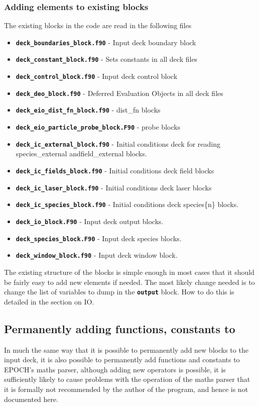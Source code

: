 \documentclass[12pt,a4paper]{article}
\newcommand{\inlinecode}[1]{{\color{warwickred} \bf\texttt{#1}}}
\newcommand{\EPOCH}{{\color{warwickdark}\fontfamily{phv}\selectfont{EPOCH}}}
\begin{document}
\subsubsection{Adding elements to existing blocks}
The existing blocks in the code are read in the following files
\begin{itemize}
\item \inlinecode{deck\_boundaries\_block.f90} - Input deck boundary block
\item \inlinecode{deck\_constant\_block.f90} - Sets constants in all deck files
\item \inlinecode{deck\_control\_block.f90} - Input deck control block
\item \inlinecode{deck\_deo\_block.f90} - Deferred Evaluation Objects in all
  deck files
\item \inlinecode{deck\_eio\_dist\_fn\_block.f90} - dist\_fn blocks
\item \inlinecode{deck\_eio\_particle\_probe\_block.F90} - probe blocks
\item \inlinecode{deck\_ic\_external\_block.f90} - Initial conditions deck for
  reading species\_external and\linebreak field\_external blocks.
\item \inlinecode{deck\_ic\_fields\_block.f90} - Initial conditions deck field
  blocks
\item \inlinecode{deck\_ic\_laser\_block.f90} - Initial conditions deck laser
  blocks
\item \inlinecode{deck\_ic\_species\_block.f90} - Initial conditions deck
  species\{n\} blocks.
\item \inlinecode{deck\_io\_block.F90} - Input deck output blocks.
\item \inlinecode{deck\_species\_block.F90} - Input deck species blocks.
\item \inlinecode{deck\_window\_block.f90} - Input deck window block.
\end{itemize}

The existing structure of the blocks is simple enough in most cases that it
should be fairly easy to add new elements if needed. The most likely change
needed is to change the list of variables to dump in the \inlinecode{output}
block. How to do this is detailed in the section on {\EPOCH} IO.

\subsection{Permanently adding functions, constants to {\EPOCH}}
In much the same way that it is possible to permanently add new blocks to the
input deck, it is also possible to permanently add functions and constants to
EPOCH's maths parser, although adding new operators is possible, it is
sufficiently likely to cause problems with the operation of the maths parser
that it is formally not recommended by the author of the program, and hence is
not documented here.
\end{document}
